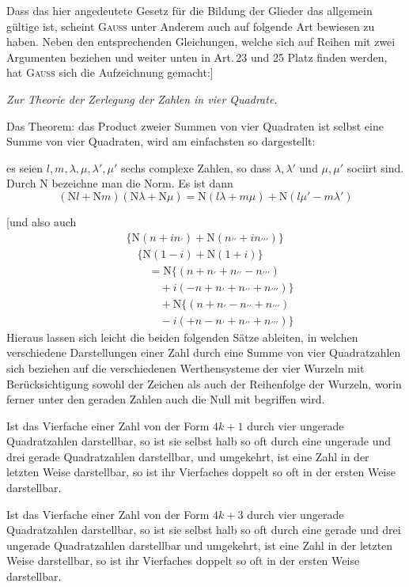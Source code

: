 %
Dass das hier angedeutete Gesetz für die Bildung der Glieder das allgemein gültige ist, scheint \textsc{Gauss} unter Anderem auch auf folgende Art bewiesen
zu haben. Neben den entsprechenden Gleichungen, welche sich auf Reihen mit
zwei Argumenten beziehen und weiter unten in Art.\,23 und 25 Platz finden werden, hat \textsc{Gauss} sich die Aufzeichnung gemacht:]

\begingroup\itshape
Zur Theorie der Zerlegung der Zahlen in vier Quadrate.

Das Theorem: das Product zweier Summen von vier Quadraten ist selbst eine
Summe von vier Quadraten, wird am einfachsten so dargestellt:

es seien $l,m,\lambda,\mu,\lambda',\mu'$ sechs complexe Zahlen, so dass $\lambda,\lambda'$ und $\mu,\mu'$ sociirt sind.
Durch $\mathrm N$ bezeichne man die Norm. Es ist dann
\[
(\mathrm Nl+\mathrm Nm)(\mathrm N\lambda+\mathrm N\mu)
=\mathrm N(l\lambda+m\mu)+\mathrm N(l\mu'-m\lambda')
\]
\par\endgroup
[und also auch
\[
\begin{aligned}
&\{\mathrm N(n+in_{\prime})+\mathrm N(n_{\prime\prime}+in_{\prime\prime\prime})\}
\\&\quad\{\mathrm N(1-i)+\mathrm N(1+i)\}\\
&\qquad=\mathrm N\{(n+n_{\prime}+n_{\prime\prime}-n_{\prime\prime\prime})
\\&\qquad\quad+i(-n+n_{\prime}+n_{\prime\prime}+n_{\prime\prime\prime})\}\\
&\qquad\quad+\mathrm N\{(n+n_{\prime}-n_{\prime\prime}+n_{\prime\prime\prime})
\\&\qquad\quad-i(+n-n_{\prime}+n_{\prime\prime}+n_{\prime\prime\prime})\}
\end{aligned}
\]
Hieraus lassen sich leicht die beiden folgenden Sätze ableiten, in welchen
verschiedene Darstellungen einer Zahl durch eine Summe von vier Quadratzahlen
sich beziehen auf die verschiedenen Werthensysteme der vier Wurzeln mit Berücksichtigung sowohl der Zeichen als auch der Reihenfolge der Wurzeln, worin
ferner unter den geraden Zahlen auch die Null mit begriffen wird.

Ist das Vierfache einer Zahl von der Form $4k+1$ durch vier ungerade
Quadratzahlen darstellbar, so ist sie selbst halb so oft durch eine ungerade und
drei gerade Quadratzahlen darstellbar, und umgekehrt, ist eine Zahl in der letzten Weise darstellbar, so ist ihr Vierfaches doppelt so oft in der ersten Weise
darstellbar.

Ist das Vierfache einer Zahl von der Form $4k+3$ durch vier ungerade
Quadratzahlen darstellbar, so ist sie selbst halb so oft durch eine gerade und
drei ungerade Quadratzahlen darstellbar und umgekehrt, ist eine Zahl in der letzten Weise darstellbar, so ist ihr Vierfaches doppelt so oft in der ersten Weise
darstellbar.

